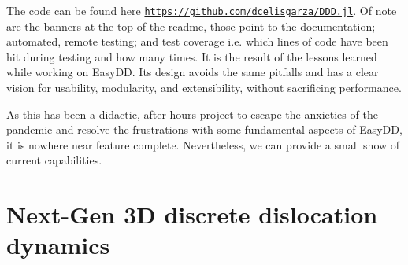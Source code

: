 The code can be found here \href{https://github.com/dcelisgarza/DDD.jl}{\texttt{https://github.com/dcelisgarza/DDD.jl}}. Of note are the banners at the top of the readme, those point to the documentation; automated, remote testing; and test coverage i.e. which lines of code have been hit during testing and how many times. It is the result of the lessons learned while working on EasyDD. Its design avoids the same pitfalls and has a clear vision for usability, modularity, and extensibility, without sacrificing performance.

As this has been a didactic, after hours project to escape the anxieties of the pandemic and resolve the frustrations with some fundamental aspects of EasyDD, it is nowhere near feature complete. Nevertheless, we can provide a small show of current capabilities.

\section{Next-Gen 3D discrete dislocation dynamics}


